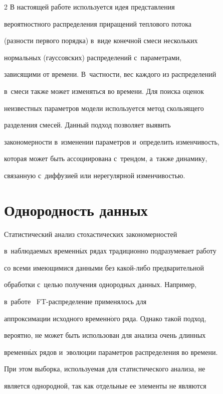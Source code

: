 \begin{multicols}{2}
В настоящей работе используется идея представления


вероятностного распределения приращений теплового потока


(разности первого порядка) в~виде конечной смеси нескольких


нормальных (гауссовских) распределений с~параметрами,


зависящими от времени. В~частности, вес каждого из распределений


в~смеси также может изменяться во времени. Для поиска оценок


неизвестных па\-ра\-мет\-ров модели используется метод скользящего


разделения смесей. Данный подход позволяет выявить


закономерности в~изменении параметров и~определить изменчивость,


которая может быть ассоциирована с~трендом, а~также динамику,


связанную с~диффузией или нерегулярной изменчивостью.





\section{Однородность данных}





Статистический анализ стохастических закономерностей 


в~наблюдаемых временн$\acute{\mbox{ы}}$х рядах традиционно подразумевает работу


со всеми име\-ющи\-мися данными без ка\-кой-ли\-бо предварительной\linebreak


обработки с~целью получения однородных данных. Например, 


в~работе~\cite{Gulev2012} FT-рас\-пре\-де\-ле\-ние применялось для


аппроксимации исходного временн$\acute{\mbox{о}}$го ряда. Однако такой подход,


вероятно, не может быть использован для анализа очень длинных


временн$\acute{\mbox{ы}}$х рядов и~эволюции параметров распределения во времени.


При этом выборка, используемая для статистического анализа, не


является однородной, так как отдельные ее элементы не являются



\end{multicols}

